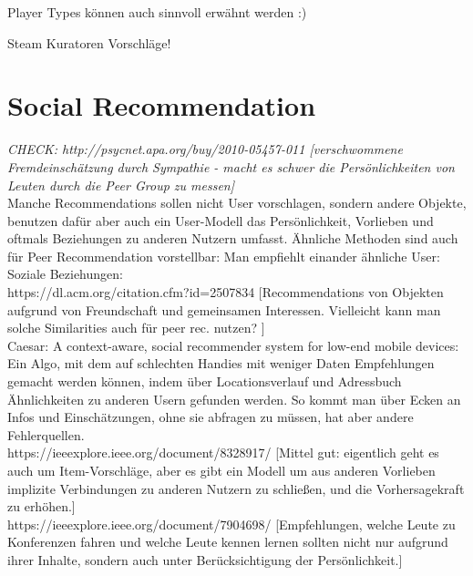 \documentclass[nochapterpage,bigchapter,linedtoc,longdoc,colorback,accentcolor=tud3b,oneside]{tudreport}
\begin{document}
Player Types können auch sinnvoll erwähnt werden :)

Steam Kuratoren Vorschläge! 

\section{Social Recommendation}

\textit{CHECK: http://psycnet.apa.org/buy/2010-05457-011 [verschwommene Fremdeinschätzung durch Sympathie - macht es schwer die Persönlichkeiten von Leuten durch die Peer Group zu messen] \cite{leising2010letter}}\\

Manche Recommendations sollen nicht User vorschlagen, sondern andere Objekte, benutzen dafür aber auch ein User-Modell das Persönlichkeit, Vorlieben und oftmals Beziehungen zu anderen Nutzern umfasst. Ähnliche Methoden sind auch für Peer Recommendation vorstellbar: Man empfiehlt einander ähnliche User: \\

Soziale Beziehungen:\\

https://dl.acm.org/citation.cfm?id=2507834 [Recommendations von Objekten aufgrund von Freundschaft und gemeinsamen Interessen. Vielleicht kann man solche Similarities auch für peer rec. nutzen? ] \cite{feng2013recommendation}\\

Caesar: A context-aware, social recommender system for low-end mobile devices: Ein Algo, mit dem auf schlechten Handies mit weniger Daten Empfehlungen gemacht werden können, indem über Locationsverlauf und Adressbuch Ähnlichkeiten zu anderen Usern gefunden werden. So kommt man über Ecken an Infos und Einschätzungen, ohne sie abfragen zu müssen, hat aber andere Fehlerquellen. \cite{ramaswamy2009caesar}\\

https://ieeexplore.ieee.org/document/8328917/ [Mittel gut: eigentlich geht es auch um Item-Vorschläge, aber es gibt ein Modell um aus anderen Vorlieben implizite Verbindungen zu anderen Nutzern zu schließen, und die Vorhersagekraft zu erhöhen.] \cite{hsu2018general}\\

https://ieeexplore.ieee.org/document/7904698/  [Empfehlungen, welche Leute zu Konferenzen fahren und welche Leute kennen lernen sollten nicht nur aufgrund ihrer Inhalte, sondern auch unter Berücksichtigung der Persönlichkeit.] \cite{asabere2017improving}\\
\end{document}
